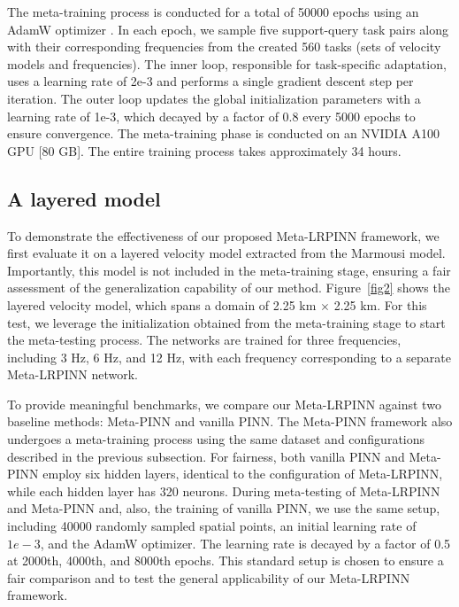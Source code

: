 The meta-training process is conducted for a total of 50000 epochs using an AdamW optimizer \citep{loshchilov2017decoupled}. In each epoch, we sample five support-query task pairs along with their corresponding frequencies from the created 560 tasks (sets of velocity models and frequencies). The inner loop, responsible for task-specific adaptation, uses a learning rate of 2e-3 and performs a single gradient descent step per iteration. The outer loop updates the global initialization parameters with a learning rate of 1e-3, which decayed by a factor of 0.8 every 5000 epochs to ensure convergence. The meta-training phase is conducted on an NVIDIA A100 GPU [80 GB]. The entire training process takes approximately 34 hours. 

\subsection{A layered model}
To demonstrate the effectiveness of our proposed Meta-LRPINN framework, we first evaluate it on a layered velocity model extracted from the Marmousi model. Importantly, this model is not included in the meta-training stage, ensuring a fair assessment of the generalization capability of our method. Figure~\ref{fig2} shows the layered velocity model, which spans a domain of 2.25 km $\times$ 2.25 km. For this test, we leverage the initialization obtained from the meta-training stage to start the meta-testing process. The networks are trained for three frequencies, including 3 Hz, 6 Hz, and 12 Hz, with each frequency corresponding to a separate Meta-LRPINN network. 

To provide meaningful benchmarks, we compare our Meta-LRPINN against two baseline methods: Meta-PINN and vanilla PINN. The Meta-PINN framework also undergoes a meta-training process using the same dataset and configurations described in the previous subsection. For fairness, both vanilla PINN and Meta-PINN employ six hidden layers, identical to the configuration of Meta-LRPINN, while each hidden layer has 320 neurons. During meta-testing of Meta-LRPINN and Meta-PINN and, also, the training of vanilla PINN, we use the same setup, including 40000 randomly sampled spatial points, an initial learning rate of $1e-3$, and the AdamW optimizer. The learning rate is decayed by a factor of 0.5 at 2000th, 4000th, and 8000th epochs. This standard setup is chosen to ensure a fair comparison and to test the general applicability of our Meta-LRPINN framework. 

